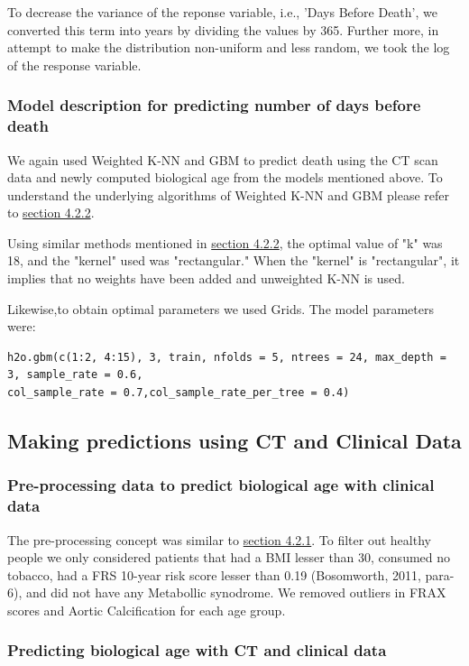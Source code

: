 \documentclass{article}
\begin{document}
To decrease the variance of the reponse variable, i.e., 'Days Before Death', we converted this term into years by dividing the values by 365. Further more, in attempt to make the distribution non-uniform and less random, we took the log of the response variable.

\subsubsection{Model description for predicting number of days before death}

We again used Weighted K-NN and GBM to predict death using the CT scan data and newly computed biological age from the models mentioned above. To understand the underlying algorithms of Weighted K-NN and GBM please refer to \hyperref[sec:one]{section 4.2.2}. 

Using similar methods mentioned in \hyperref[sec:one]{section 4.2.2}, the optimal value of "k" was 18, and the "kernel" used was "rectangular." When the "kernel" is "rectangular", it implies that no weights have been added and unweighted K-NN is used.  

Likewise,to obtain optimal parameters we used Grids. The model parameters were:
\begin{verbatim}
h2o.gbm(c(1:2, 4:15), 3, train, nfolds = 5, ntrees = 24, max_depth = 3, sample_rate = 0.6,
col_sample_rate = 0.7,col_sample_rate_per_tree = 0.4)
\end{verbatim}

\subsection{Making predictions using CT and Clinical Data}

\subsubsection{Pre-processing data to predict biological age with clinical data}
The pre-processing concept was similar to \hyperref[sec:two]{section 4.2.1}. To filter out healthy people we only considered patients that had a BMI lesser than 30, consumed no tobacco, had a FRS 10-year risk score lesser than 0.19 (Bosomworth, 2011, para-6), and did not have any Metabollic synodrome. We removed outliers in FRAX scores and Aortic Calcification for each age group.

\subsubsection{Predicting biological age with CT and clinical data}
\end{document}
